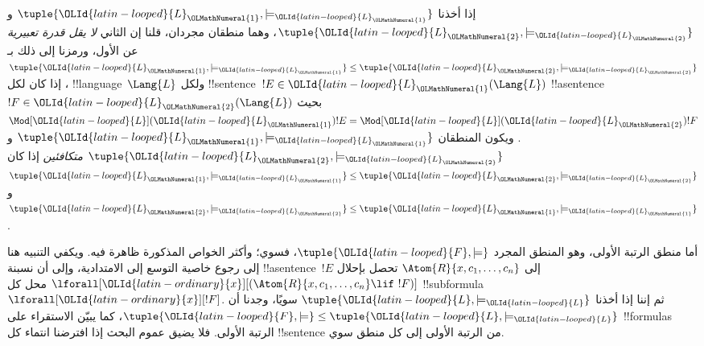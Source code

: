\documentclass[../../../include/open-logic-section]{subfiles}
\begin{document}
\begin{defn}
إذا أخذنا $\tuple{{\OLId{latin-looped}{L}}_{\OLMathNumeral{1}},\models_{{\OLId{latin-looped}{L}}_{\OLMathNumeral{1}}}}$ و$\tuple{{\OLId{latin-looped}{L}}_{\OLMathNumeral{2}},\models_{{\OLId{latin-looped}{L}}_{\OLMathNumeral{2}}}}$، وهما منطقان
مجردان، قلنا إن الثاني \emph{لا يقل قدرة تعبيرية} عن الأول، ورمزنا إلى ذلك بـ
$\tuple{{\OLId{latin-looped}{L}}_{\OLMathNumeral{1}},\models_{{\OLId{latin-looped}{L}}_{\OLMathNumeral{1}}}} \leq \tuple{{\OLId{latin-looped}{L}}_{\OLMathNumeral{2}},\models_{{\OLId{latin-looped}{L}}_{\OLMathNumeral{2}}}}$، إذا كان
لكل !!{language}~$\Lang{L}$ ولكل !!{sentence}~$!E \in {\OLId{latin-looped}{L}}_{\OLMathNumeral{1}}(\Lang{L})$
!!a{sentence}~$!F \in {\OLId{latin-looped}{L}}_{\OLMathNumeral{2}}(\Lang{L})$ بحيث
$\Mod[{\OLId{latin-looped}{L}}]({\OLId{latin-looped}{L}}_{\OLMathNumeral{1}}){!E}=\Mod[{\OLId{latin-looped}{L}}]({\OLId{latin-looped}{L}}_{\OLMathNumeral{2}}){!F}$. ويكون المنطقان
$\tuple{{\OLId{latin-looped}{L}}_{\OLMathNumeral{1}},\models_{{\OLId{latin-looped}{L}}_{\OLMathNumeral{1}}}}$ و$\tuple{{\OLId{latin-looped}{L}}_{\OLMathNumeral{2}},\models_{{\OLId{latin-looped}{L}}_{\OLMathNumeral{2}}}}$
\emph{متكافئين} إذا كان
$\tuple{{\OLId{latin-looped}{L}}_{\OLMathNumeral{1}},\models_{{\OLId{latin-looped}{L}}_{\OLMathNumeral{1}}}} \leq \tuple{{\OLId{latin-looped}{L}}_{\OLMathNumeral{2}},\models_{{\OLId{latin-looped}{L}}_{\OLMathNumeral{2}}}}$ و
$\tuple{{\OLId{latin-looped}{L}}_{\OLMathNumeral{2}},\models_{{\OLId{latin-looped}{L}}_{\OLMathNumeral{2}}}} \leq \tuple{{\OLId{latin-looped}{L}}_{\OLMathNumeral{1}},\models_{{\OLId{latin-looped}{L}}_{\OLMathNumeral{1}}}}$.
\end{defn}

\begin{rem}
  أما منطق الرتبة الأولى، وهو المنطق المجرد $\tuple{{\OLId{latin-looped}{F}},\models}$، فسوي؛
  وأكثر الخواص المذكورة ظاهرة فيه. ويكفي التنبيه هنا إلى
  رجوع خاصية التوسع إلى الامتدادية، وإلى أن نسبنة !!a{sentence}~$!E$ إلى
  $\Atom{R}{x,c_1,\dots,c_n}$ تحصل بإحلال
  $\lforall[{\OLId{latin-ordinary}{x}}][(\Atom{R}{x,c_1,\dots,c_n} \lif \ !F)]$ محل كل
  !!{subformula}~$\lforall[{\OLId{latin-ordinary}{x}}][!F]$. ثم إننا إذا أخذنا
  $\tuple{{\OLId{latin-looped}{L}},\models_{\OLId{latin-looped}{L}}}$ سويًا، وجدنا أن
  $\tuple{{\OLId{latin-looped}{F}},\models} \leq \tuple{{\OLId{latin-looped}{L}},\models_{\OLId{latin-looped}{L}}}$، كما يبيّن الاستقراء على
  !!{formula}s الرتبة الأولى. فلا يضيق عموم البحث إذا افترضنا
  انتماء كل !!{sentence} من الرتبة الأولى إلى كل منطق سوي.
\end{rem}
\end{document}
